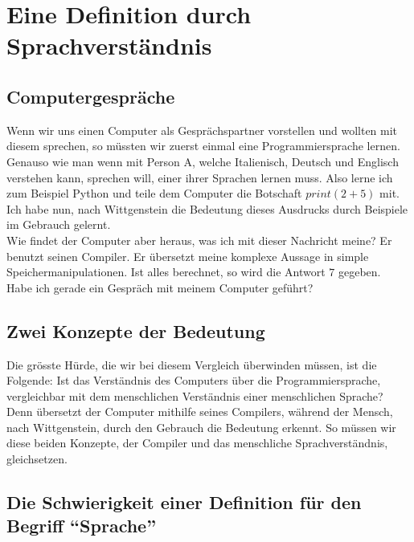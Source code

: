 \documentclass[10pt,a4paper]{article}
\begin{document}
\section{Eine Definition durch Sprachverständnis}
\subsection{Computergespräche}
Wenn wir uns einen Computer als Gesprächspartner vorstellen und wollten mit diesem sprechen, so müssten wir zuerst einmal eine Programmiersprache lernen. Genauso wie man wenn mit Person A, welche Italienisch, Deutsch und Englisch verstehen kann, sprechen will, einer ihrer Sprachen lernen muss. Also lerne ich zum Beispiel Python und teile dem Computer die Botschaft $print(2 + 5)$ mit. Ich habe nun, nach Wittgenstein die Bedeutung dieses Ausdrucks durch Beispiele im Gebrauch gelernt.  \\
Wie findet der Computer aber heraus, was ich mit dieser Nachricht meine? Er benutzt seinen Compiler. Er übersetzt meine komplexe Aussage in simple Speichermanipulationen. Ist alles berechnet, so wird die Antwort $7$ gegeben. \\ Habe ich gerade ein Gespräch mit meinem Computer geführt?

\subsection{Zwei Konzepte der Bedeutung}
Die grösste Hürde, die wir bei diesem Vergleich überwinden müssen, ist die Folgende: Ist das Verständnis des Computers über die Programmiersprache, vergleichbar mit dem menschlichen Verständnis einer menschlichen Sprache? Denn übersetzt der Computer mithilfe seines Compilers, während der Mensch, nach Wittgenstein, durch den Gebrauch die Bedeutung erkennt. So müssen wir diese beiden Konzepte, der Compiler und das menschliche Sprachverständnis, gleichsetzen.

\subsection{Die Schwierigkeit einer Definition für den Begriff \enquote{Sprache}}
\end{document}
